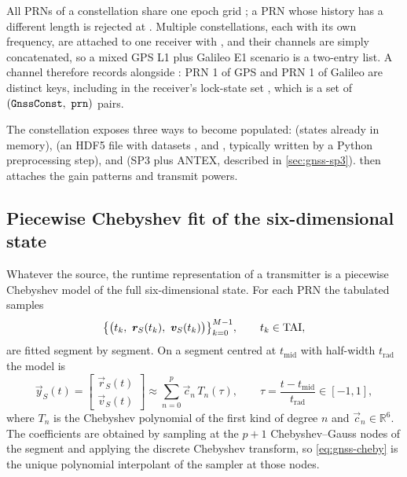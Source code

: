 All PRNs of a constellation share one epoch grid ; a PRN whose
history has a different length is rejected at
. Multiple constellations, each with its own
frequency, are attached to one receiver with
, and their channels are simply
concatenated, so a mixed GPS L1 plus Galileo E1 scenario is a two-entry list.
A channel therefore records  alongside : PRN 1 of
GPS and PRN 1 of Galileo are distinct keys, including in the receiver's
lock-state set , which is a set of
$(\texttt{GnssConst},\ \texttt{prn})$ pairs.

The constellation exposes three ways to become populated:
 (states already in memory), 
(an HDF5 file with datasets ,  and
, typically written by a Python preprocessing step), and
 (SP3 plus ANTEX, described in
\cref{sec:gnss-sp3}).  then attaches the gain patterns
and transmit powers.

\subsection{Piecewise Chebyshev fit of the six-dimensional state}
\label{sec:gnss-chebyshev}

Whatever the source, the runtime representation of a transmitter is a
piecewise Chebyshev model of the full six-dimensional state. For each PRN the
tabulated samples
\begin{equation}
  \label{eq:gnss-eph-table}
  \bigl\{ \bigl(t_k,\ \bm{r}_S(t_k),\ \bm{v}_S(t_k) \bigr) \bigr\}_{k=0}^{M-1},
  \qquad t_k \in \mathrm{TAI} ,
\end{equation}
are fitted segment by segment. On a segment centred at $t_{\mathrm{mid}}$ with
half-width $t_{\mathrm{rad}}$ the model is
\begin{equation}
  \label{eq:gnss-cheby}
  \vec{y}_S(t)
  = \begin{bmatrix} \vec{r}_S(t) \\ \vec{v}_S(t) \end{bmatrix}
  \approx \sum_{n=0}^{p} \vec{c}_n\, T_n(\tau),
  \qquad
  \tau = \frac{t - t_{\mathrm{mid}}}{t_{\mathrm{rad}}} \in [-1,1],
\end{equation}
where $T_n$ is the Chebyshev polynomial of the first kind of degree $n$ and
$\vec{c}_n \in \mathbb{R}^6$. The coefficients are obtained by sampling at the
$p+1$ Chebyshev--Gauss nodes of the segment and applying the discrete
Chebyshev transform, so \cref{eq:gnss-cheby} is the unique polynomial
interpolant of the sampler at those nodes.

